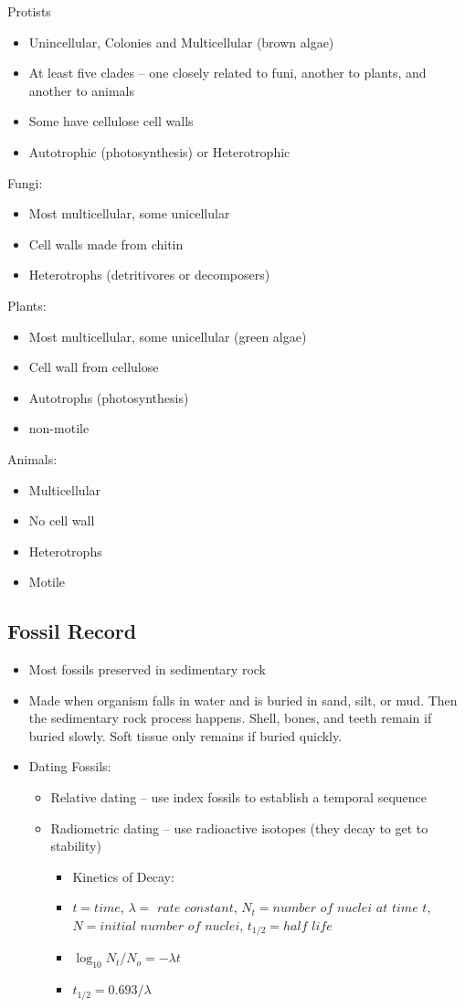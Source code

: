 \documentclass{article}
\begin{document}
Protists
\begin{itemize}
\item Unincellular, Colonies and Multicellular (brown algae)
\item At least five clades -- one closely related to funi, another to plants, and another to animals
\item Some have cellulose cell walls
\item Autotrophic (photosynthesis) or Heterotrophic
\end{itemize}

Fungi:
\begin{itemize}
\item Most multicellular, some unicellular
\item Cell walls made from chitin
\item Heterotrophs (detritivores or decomposers)
\end{itemize}

Plants:
\begin{itemize}
\item Most multicellular, some unicellular (green algae)
\item Cell wall from cellulose
\item Autotrophs (photosynthesis) \item non-motile \end{itemize} Animals: \begin{itemize} \item Multicellular \item No cell wall \item Heterotrophs \item Motile \end{itemize}

\subsection{Fossil Record}
\begin{itemize}
\item Most fossils preserved in sedimentary rock
\item Made when organism falls in water and is buried in sand, silt, or mud. Then the sedimentary rock process happens. Shell, bones, and teeth remain if buried slowly. Soft tissue only remains if buried quickly.
\item Dating Fossils:
\begin{itemize}
\item Relative dating -- use index fossils to establish a temporal sequence
\item Radiometric dating -- use radioactive isotopes (they decay to get to stability)
\begin{itemize}
\item Kinetics of Decay:
\item $t=time$, $\lambda =$ $rate$ $constant$, $N_t =number$ $of$ $nuclei$ $at$ $time$ $t$, $N=initial$ $number$ $of$ $nuclei$, $t_{1/2}=half$ $life$
\item $\log_{10} {N_t/N_o} = -\lambda t$
\item $t_{1/2}={0.693}/{\lambda}$
\end{itemize}
\end{itemize}
\end{itemize}
\end{document}
